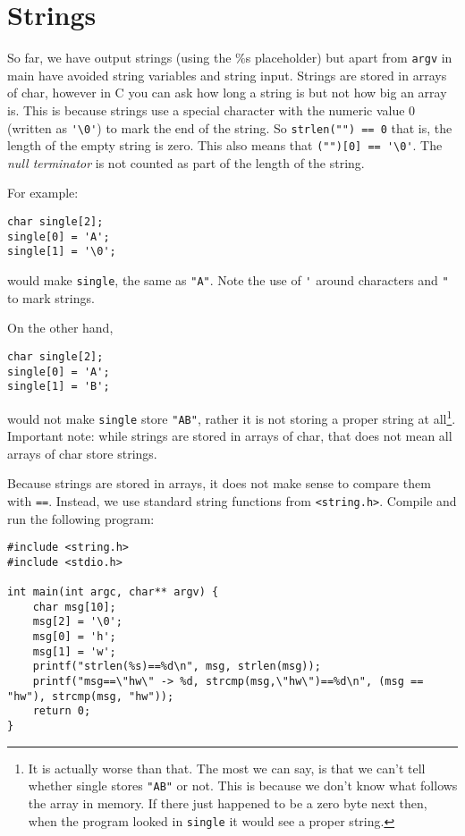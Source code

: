 
\chapter{Strings}



So far, we have output strings (using the \%s placeholder) but apart from \texttt{argv} in main have avoided string variables and string input.
Strings are stored in arrays of char, however in C you can ask how long a string is but not how big an array is.
This is because strings use a special character with the numeric value $0$ (written as \verb!'\0'!) to mark the end of the string.
So \lstinline!strlen("") == 0! that is, the length of the empty string is zero.
This also means that \lstinline!("")[0] == '\0'!.
The \emph{null terminator} is not counted as part of the length of the string.


For example:

\begin{lstlisting}
char single[2];
single[0] = 'A';
single[1] = '\0';
\end{lstlisting}

would make \texttt{single}, the same as \verb!"A"!.
Note the use of \verb!'! around characters and \verb!"! to mark strings.

On the other hand,
\begin{lstlisting}
char single[2];
single[0] = 'A';
single[1] = 'B';
\end{lstlisting}
would not make \texttt{single} store \verb!"AB"!, rather it is not storing a proper string at all\footnote{It is actually worse than that.
The most we can say, is that we can't tell whether single stores \texttt{"AB"} or not.
This is because we don't know what follows the array in memory.
If there just happened to be a zero byte next then, when the program looked in \texttt{single} it would see a proper string.
}.
Important note: while strings are stored in arrays of char, that does not mean all arrays of char store strings.

Because strings are stored in arrays, it does not make sense to compare them with \texttt{==}.
Instead, we use standard string functions from \lstinline{<string.h>}.
Compile and run the following program:
\begin{lstlisting}
#include <string.h>
#include <stdio.h>

int main(int argc, char** argv) {
    char msg[10];	
    msg[2] = '\0';
    msg[0] = 'h';
    msg[1] = 'w';
    printf("strlen(%s)==%d\n", msg, strlen(msg));
    printf("msg==\"hw\" -> %d, strcmp(msg,\"hw\")==%d\n", (msg == "hw"), strcmp(msg, "hw"));
    return 0;
}
\end{lstlisting}

